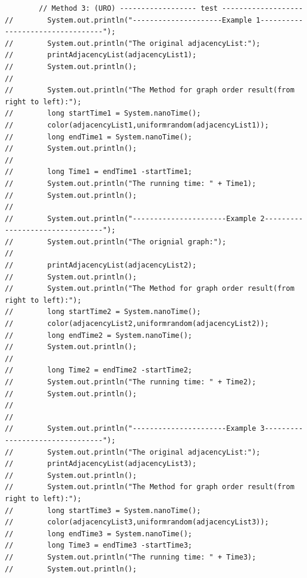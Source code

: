 \documentclass{article}
\begin{document}
\begin{verbatim}
        // Method 3: (URO) ------------------ test -------------------
//        System.out.println("---------------------Example 1---------------------------------");
//        System.out.println("The original adjacencyList:");
//        printAdjacencyList(adjacencyList1);
//        System.out.println();
//
//        System.out.println("The Method for graph order result(from right to left):");
//        long startTime1 = System.nanoTime();
//        color(adjacencyList1,uniformrandom(adjacencyList1));
//        long endTime1 = System.nanoTime();
//        System.out.println();
//
//        long Time1 = endTime1 -startTime1;
//        System.out.println("The running time: " + Time1);
//        System.out.println();
//
//        System.out.println("----------------------Example 2--------------------------------");
//        System.out.println("The orignial graph:");
//
//        printAdjacencyList(adjacencyList2);
//        System.out.println();
//        System.out.println("The Method for graph order result(from right to left):");
//        long startTime2 = System.nanoTime();
//        color(adjacencyList2,uniformrandom(adjacencyList2));
//        long endTime2 = System.nanoTime();
//        System.out.println();
//
//        long Time2 = endTime2 -startTime2;
//        System.out.println("The running time: " + Time2);
//        System.out.println();
//
//
//        System.out.println("----------------------Example 3--------------------------------");
//        System.out.println("The original adjacencyList:");
//        printAdjacencyList(adjacencyList3);
//        System.out.println();
//        System.out.println("The Method for graph order result(from right to left):");
//        long startTime3 = System.nanoTime();
//        color(adjacencyList3,uniformrandom(adjacencyList3));
//        long endTime3 = System.nanoTime();
//        long Time3 = endTime3 -startTime3;
//        System.out.println("The running time: " + Time3);
//        System.out.println();


\end{verbatim}
\end{document}
